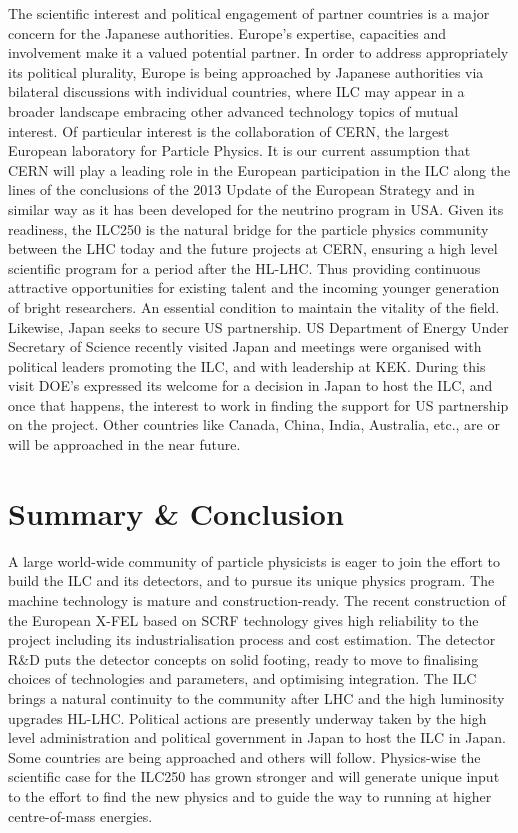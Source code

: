 \documentclass[%
 reprint,
 amsmath,amssymb,
 aps,
]{revtex4-1}
\begin{document}
The scientific interest and political engagement of partner countries is a major concern for the Japanese authorities. Europe's expertise, capacities and involvement make it a valued potential partner. In order to address appropriately its political plurality, Europe is being approached by Japanese authorities via bilateral discussions with individual countries, where ILC may appear in a broader landscape embracing other advanced technology topics of mutual interest. Of particular interest is the collaboration of CERN, the largest European laboratory for Particle Physics. It is our current assumption that CERN will play a leading role in the European participation in the ILC along the lines of the conclusions of the 2013 Update of the European Strategy and in similar way as it has been developed for the neutrino program in USA. Given its readiness, the ILC250 is the natural bridge for the particle physics community between the LHC today and the future projects at CERN, ensuring a high level scientific program for a period after the HL-LHC. Thus  providing continuous attractive opportunities for existing talent and the incoming younger generation of bright researchers. An essential condition to maintain the vitality of the field.  Likewise, Japan seeks to secure US partnership. US Department of Energy Under Secretary of Science recently visited Japan and meetings were organised with political leaders promoting the ILC, and with leadership at KEK. During this visit DOE's expressed its welcome for a decision in Japan to host the ILC, and once that happens, the interest to work in finding the support for US partnership on the project. Other countries like Canada, China, India, Australia, etc., are or will be approached in the near future.

\section{\label{sec:sum}Summary \& Conclusion} 

A large world-wide community of particle physicists is eager to join the effort to build the
ILC and its detectors, and to pursue its unique physics program.  The machine technology is mature
and construction-ready. The recent construction of the European X-FEL based on SCRF technology gives high reliability to the project including its industrialisation process and cost estimation. The detector R\&D puts the detector concepts on solid footing, ready to move to finalising choices of technologies and parameters, and optimising integration. The ILC brings a natural continuity to the community after LHC and the high luminosity upgrades HL-LHC. Political actions are presently underway taken by the high level administration and political government in Japan to host the ILC in Japan. Some countries are being approached and others will follow. Physics-wise the scientific case for the ILC250 has grown stronger and will generate unique input to the effort to find the new physics and to guide the way to running at higher centre-of-mass energies.
\end{document}
